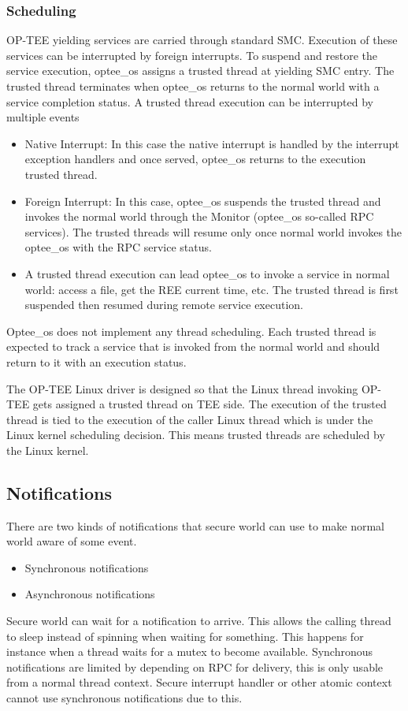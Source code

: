 \documentclass{article}
\begin{document}
\subsubsection{Scheduling}

OP-TEE yielding services are carried through standard SMC. Execution of these services can be interrupted by foreign interrupts. To suspend and restore the service execution, optee\_os assigns a trusted thread at yielding SMC entry. The trusted thread terminates when optee\_os returns to the normal world with a service completion status. A trusted thread execution can be interrupted by multiple events \begin{itemize}
\item Native Interrupt: In this case the native interrupt is handled by the interrupt exception handlers and once served, optee\_os returns to the execution trusted thread.
\item Foreign Interrupt: In this case, optee\_os suspends the trusted thread and invokes the normal world through the Monitor (optee\_os so-called RPC services). The trusted threads will resume only once normal world invokes the optee\_os with the RPC service status.
\item A trusted thread execution can lead optee\_os to invoke a service in normal world: access a file, get the REE current time, etc. The trusted thread is first suspended then resumed during remote service execution.
\end{itemize} 
Optee\_os does not implement any thread scheduling. Each trusted thread is expected to track a service that is invoked from the normal world and should return to it with an execution status. 
\medskip

The OP-TEE Linux driver is designed so that the Linux thread invoking OP-TEE gets assigned a trusted thread on TEE side. The execution of the trusted thread is tied to the execution of the caller Linux thread which is under the Linux kernel scheduling decision. This means trusted threads are scheduled by the Linux kernel.

\subsection{Notifications}

There are two kinds of notifications that secure world can use to make normal world aware of some event. \begin{itemize}
\item Synchronous notifications
\item Asynchronous notifications
\end{itemize}
Secure world can wait for a notification to arrive. This allows the calling thread to sleep instead of spinning when waiting for something. This happens for instance when a thread waits for a mutex to become available. Synchronous notifications are limited by depending on RPC for delivery, this is only usable from a normal thread context. Secure interrupt handler or other atomic context cannot use synchronous notifications due to this.
\medskip
\end{document}
